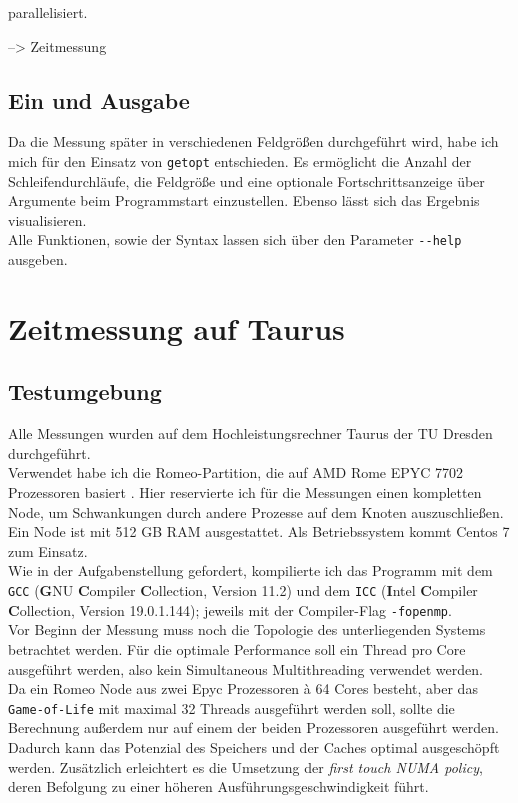 \documentclass[german,plainarticle,hyperref,utf8]{zihpub}
\begin{document}
	parallelisiert.
	
	--> Zeitmessung
	
	
	\subsection{Ein und Ausgabe}
	Da die Messung später in verschiedenen Feldgrößen durchgeführt wird, habe ich mich für den Einsatz von \verb|getopt| entschieden. Es ermöglicht die Anzahl der Schleifendurchläufe, die Feldgröße und eine optionale Fortschrittsanzeige über Argumente beim Programmstart einzustellen.
	Ebenso lässt sich das Ergebnis visualisieren.\\
	Alle Funktionen, sowie der Syntax lassen sich über den Parameter \texttt{-{}-help} ausgeben.
	
	\section{Zeitmessung auf Taurus}
	\subsection{Testumgebung} \label{umgebung}
	Alle Messungen wurden auf dem Hochleistungsrechner Taurus der TU Dresden durchgeführt.\\
	Verwendet habe ich die Romeo-Partition, die auf AMD Rome EPYC 7702 Prozessoren basiert \cite{hpc}. Hier reservierte ich für die Messungen einen kompletten Node, um Schwankungen durch andere Prozesse auf dem Knoten auszuschließen. Ein Node ist mit 512 GB RAM ausgestattet. Als Betriebssystem kommt Centos 7 zum Einsatz.\\
	Wie in der Aufgabenstellung gefordert, kompilierte ich das Programm mit dem \texttt{GCC} (\textbf{G}NU \textbf{C}ompiler \textbf{C}ollection, Version 11.2) und dem \texttt{ICC} (\textbf{I}ntel \textbf{C}ompiler \textbf{C}ollection, Version 19.0.1.144); jeweils mit der Compiler-Flag \texttt{-fopenmp}.\\
	
	Vor Beginn der Messung muss noch die Topologie des unterliegenden Systems betrachtet werden. Für die optimale Performance soll ein Thread pro Core ausgeführt werden, also kein Simultaneous Multithreading verwendet werden.\\
	Da ein Romeo Node aus zwei Epyc Prozessoren \`{a} 64 Cores besteht, aber das \texttt{Game-of-Life} mit maximal 32 Threads ausgeführt werden soll, sollte die Berechnung außerdem nur auf einem der beiden Prozessoren ausgeführt werden. Dadurch kann das Potenzial des Speichers und der Caches optimal ausgeschöpft werden. Zusätzlich erleichtert es die Umsetzung der \textit{first touch NUMA policy}, deren Befolgung zu einer höheren Ausführungsgeschwindigkeit führt.\\
	
\end{document}
